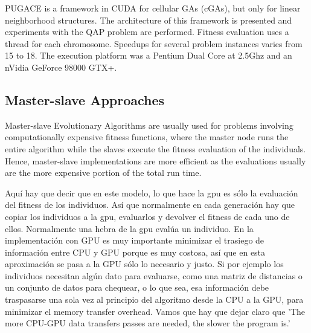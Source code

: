 \documentclass[prodmode,acmtecs]{acmsmall}
\begin{document}

PUGACE\cite{5586286} is a framework in CUDA for cellular GAs (cGAs), but only for linear neighborhood structures. The architecture of this framework is presented and experiments with the QAP problem are performed. Fitness evaluation uses a thread for each chromosome. Speedups for several problem instances varies from 15 to 18. The execution platform was a Pentium Dual Core at 2.5Ghz and an nVidia GeForce 98000 GTX+. %



\subsection{Master-slave Approaches}

Master-slave Evolutionary Algorithms are usually used for problems involving computationally expensive fitness functions, where the master node runs the entire algorithm while the slaves execute the fitness evaluation of the individuals. Hence, master-slave implementations are more efficient as the evaluations usually are the more expensive portion of the total run time.

Aquí hay que decir que en este modelo, lo que hace la gpu es sólo la evaluación del fitness de los individuos. Así que normalmente en cada generación hay que copiar los individuos a la gpu, evaluarlos y devolver el fitness de cada uno de ellos. Normalmente una hebra de la gpu evalúa un individuo. En la implementación con GPU es muy importante minimizar el trasiego de información entre CPU y GPU porque es muy costosa, así que en esta aproximación se pasa a la GPU sólo lo necesario y justo. Si por ejemplo los individuos necesitan algún dato para evaluarse, como una matriz de distancias o un conjunto de datos para chequear, o lo que sea, esa información debe traspasarse una sola vez al principio del algoritmo desde la CPU a la GPU, para minimizar el memory transfer overhead.  Vamos que hay que dejar claro que 'The more CPU-GPU data transfers passes are needed, the slower the program is.'
\end{document}

